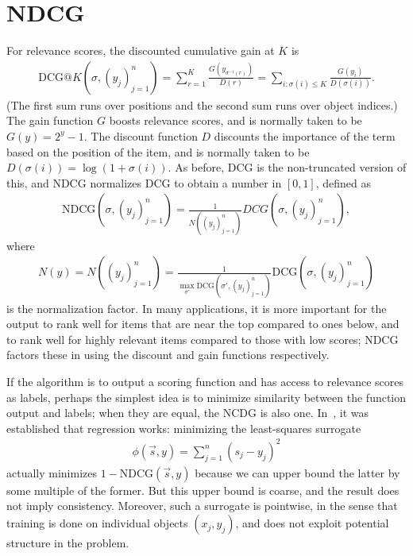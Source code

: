 \section{NDCG}
\label{sec:ndcg}
For relevance scores, the discounted cumulative gain at $K$ is 
\begin{align*}
  \text{DCG}@K(\sigma, (y_j)_{j=1}^n)
  = \sum_{r=1}^K \frac{G(y_{\sigma^{-1}(r)})}{D(r)}
  = \sum_{i: \sigma(i) \leq K} \frac{G(y_i)}{D(\sigma(i))}.
\end{align*}
(The first sum runs over positions and the second sum runs over
object indices.) The gain function $G$ boosts relevance scores, and is
normally taken to be $G(y) = 2^y - 1$. The discount function $D$ discounts
the importance of the term based on the position of the item, and is
normally taken to be $D(\sigma(i)) = \log(1 + \sigma(i))$. As before, DCG
is the non-truncated version of this, and NDCG normalizes DCG to obtain
a number in $[0,1]$, defined as
\begin{align*}
  \text{NDCG}(\sigma, (y_j)_{j=1}^n)
  = \frac{1}{N((y_j)_{j=1}^n)} DCG(\sigma, (y_j)_{j=1}^n),
\end{align*}
where
\begin{align*}
  N(y) = N((y_j)_{j=1}^n)
  = \frac{1}{\max_{\sigma'} \text{DCG}(\sigma', (y_j)_{j=1}^n)} \text{DCG}(\sigma, (y_j)_{j=1}^n)
\end{align*}
is the normalization factor. 
In many applications, it is more important for the output to rank well for
items that are near the top compared to ones below, and to rank well for
highly relevant items compared to those with low scores; NDCG factors
these in using the discount and gain functions respectively.

If the algorithm is to output a scoring function and has access to relevance
scores as labels, perhaps the simplest idea is to minimize similarity between
the function output and labels; when they are equal, the NCDG is also one.
In~\cite{bayes-optimal-subset-ranking}, it was
established that regression works: minimizing the least-squares
surrogate
\begin{align*}
  \phi(\vec{s}, y) = \sum_{j=1}^n {(s_j - y_j)}^2
\end{align*}
actually minimizes $1 - \text{NDCG}(\vec{s}, y)$ because we can upper bound
the latter by some multiple of the former. But this upper bound is coarse, and
the result does not imply consistency. 
Moreover, such a surrogate is pointwise, in the sense
that training is done on individual objects $(x_j, y_j)$, and does not
exploit potential structure in the problem.

